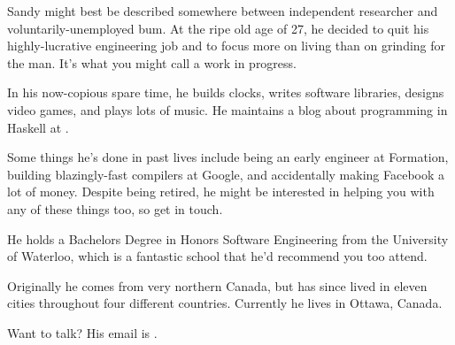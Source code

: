 Sandy might best be described somewhere between independent researcher and
voluntarily-unemployed bum. At the ripe old age of 27, he decided to quit his
highly-lucrative engineering job and to focus more on living than on grinding
for the man. It's what you might call a work in progress.

In his now-copious spare time, he builds clocks, writes software libraries,
designs video games, and plays lots of music. He maintains a blog about
programming in Haskell at .

Some things he's done in past lives include being an early engineer at
Formation, building blazingly-fast compilers at Google, and accidentally making
Facebook a lot of money. Despite being retired, he might be interested in
helping you with any of these things too, so get in touch.

He holds a Bachelors Degree in Honors Software Engineering from the University
of Waterloo, which is a fantastic school that he'd recommend you too attend.

Originally he comes from very northern Canada, but has since lived in eleven
cities throughout four different countries. Currently he lives in Ottawa,
Canada.

Want to talk? His email is .

